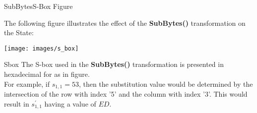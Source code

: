 \begin{frame}[t]{SubBytes}{S-Box Figure}
	
	The following figure illustrates the effect of the \textbf{SubBytes()} transformation on the State:
	
	\medspace
		
	\begin{center}
		\texttt{[image: images/s\_box]}
	\end{center}
	
\end{frame}

\begin{frame}[t]{Sbox}
	\small
	The S-box used in the \textbf{SubBytes()} transformation is presented in hexadecimal for as in figure. \\
	For example, if $s_{1,1} = {53}$, then the substitution value would be determined by the intersection of the row with index '5' and the column with index '3'. This would result in $s^{'}_{1,1}$ having a value of ${ED}$.
	

\end{frame}
